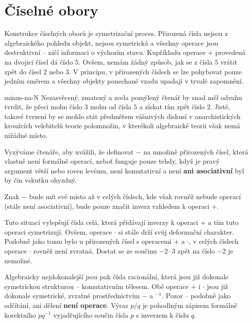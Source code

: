 \section{Číselné obory}
\label{sec:ciselne-obory}

Konstrukce číselných oborů je symetrizační proces. Přirozená čísla nejsou z
algebraického pohledu  objekt, nejsou symetrická a všechny operace
jsou destruktivní -- ničí informaci o výchozím stavu. Kupříkladu operace $+$
provedená na dvojici čísel dá číslo $5$. Ovšem, nemám žádný způsob, jak se z
čísla $5$ vrátit zpět do čísel $2$ nebo $3$. V principu, v přirozených číslech
se lze pohybovat pouze jedním směrem a všechny objekty ponechané vzadu upadají v
trvalé zapomnění.

\begin{warning}{}{minus-na-N}
 Nezasvěcený, zmatený a zcela pomýlený čtenář by snad měl odvahu tvrdit, že
 přeci mohu číslo $3$ mohu od čísla $5$ \textbf{} a získat tím zpět
 číslo $2$. Jistě, takové tvrzení by se mohlo stát předmětem vášnivých diskusí v
 anarchistických kroužcích velebitelů teorie polomnožin, v kterékoli algebraické
 teorii však nemá nižádné místo.

 Vyzýváme čtenáře, aby uvážili, že definovat  $-$ na množině
 přirozených čísel, která vlastně není formálně operací, neboť funguje pouze
 tehdy, když je pravý argument větší nebo roven levému, není komutativní a není
 \textbf{ani asociativní} byl by čin vskutku ohyzdný.

 Znak $-$ bude mít své místo až v celých číslech, kde však rovněž nebude operací
 (stále není asociativní), bude pouze značit inverz vzhledem k operaci $+$.
\end{warning}

Tuto situaci vylepšují čísla celá, která přidávají inverzy k operaci $+$ a
tím tuto operaci symetrizují. Ovšem, operace $ \cdot $ si stále drží svůj
deformační charakter. Podobně jako tomu bylo u přirozených čísel s operacemi $+$
a $ \cdot $, v celých číslech operace $ \cdot $ rovněž není zvratná. Dostat se
ze součinu $-2 \cdot 3$ zpět na číslo $-2$ je nemožné.

Algebraicky nejdokonalejší jsou pak čísla racionální, která jsou již dokonale
symetrickou strukturou -- komutativním tělesem. Obě operace $+$ i $ \cdot $ jsou
již dokonale symetrické, zvratné prostřednictvím $-$ a $^{-1}$. Pozor -- podobně
jako odčítání, ani dělení \textbf{není operace}. Výraz $p / q$ je pohodlným
zápisem formálně korektního $pq^{-1}$ vyjadřujícího součin čísla $p$ s inverzem
k číslu $q$.

